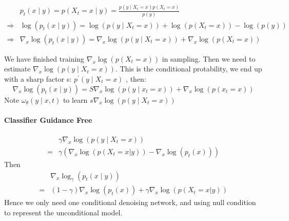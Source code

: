 \begin{equation}
    \begin{aligned}
    & p_{t}(x \mid y)=p\left(X_{t}=x \mid y\right)=\frac{p\left(y \mid X_{t}=x\right) p\left(X_{t}=x\right)}{p(y)} \\
    \Rightarrow & \log \left(p_{t}(x \mid y)\right)=\log \left(p\left(y \mid X_{t}=x\right)\right)+\log \left(p\left(X_{t}=x\right)\right)-\log (p(y)) \\
    \Rightarrow & \nabla_{x} \log \left(p_{t}(x \mid y)\right)=\nabla_{x} \log \left(p\left(y \mid X_{t}=x\right)\right)+\nabla_{x} \log \left(p\left(X_{t}=x\right)\right)
    \end{aligned}
\end{equation}
    
    
We have finished training  $\nabla_{x} \log \left(p\left(X_{t}=x\right)\right)$  in sampling. Then we need to estimate  $\nabla_{x} \log \left(p\left(y \mid X_{t}=x\right)\right)$. This is the conditional protability, we end up with a sharp factor s: $p^{\prime}\left(y \mid X_{t}=x\right)$ , then:
\begin{equation}
    \nabla_{x} \log \left(p_{t}(x \mid y)\right)=S \nabla_{x} \log \left(p\left(y \mid x_{t}=x\right)\right)+\nabla_{x} \log \left(p\left(x_{t}=x\right)\right)
\end{equation}
Note  $\omega_{\theta}(y \mid x, t)$  to learn  $s \nabla_{x} \log \left(p\left(y \mid X_{t}=x\right)\right)$ 

\paragraph{Classifier Guidance Free}
\begin{equation}
    \begin{aligned}
        &\gamma \nabla_{x} \log \left(p\left(y \mid X_{t}=x\right)\right)\\
         =& \gamma\left(\nabla_x \log \left(p(X_t=x|y)\right) - \nabla_x \log \left(p_t(x)\right)\right)
    \end{aligned}
\end{equation}
Then 
\begin{equation}
    \begin{aligned}
        &\nabla_{x} \log_\gamma \left(p_{t}(x \mid y)\right)\\
        =&(1-\gamma)\nabla_x \log \left(p_t(x)\right) + \gamma\nabla_x \log \left(p(X_t=x|y)\right)
    \end{aligned}
\end{equation}
Hence we only need one conditional denoising network, and using null condition to represent the unconditional model.


